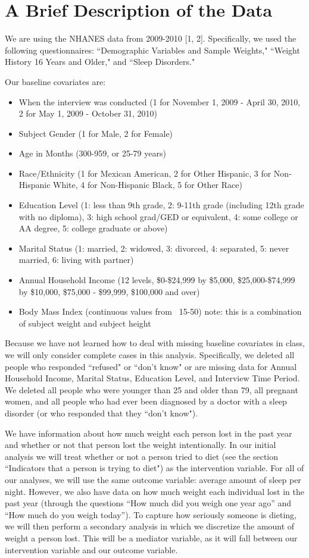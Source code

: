 \documentclass{article}
\begin{document}
\section{A Brief Description of the Data}

We are using the NHANES data from 2009-2010 [1, 2].  Specifically, we used the following questionnaires: ``Demographic Variables and Sample Weights," ``Weight History 16 Years and Older," and ``Sleep Disorders."

Our baseline covariates are:
\begin{itemize}
\item When the interview was conducted (1 for November 1, 2009 - April 30, 2010, 2 for May 1, 2009 - October 31, 2010)
\item Subject Gender (1 for Male, 2 for Female)
\item Age in Months (300-959, or 25-79 years)
\item Race/Ethnicity (1 for Mexican American, 2 for Other Hispanic, 3 for Non-Hispanic White, 4 for Non-Hispanic Black, 5 for Other Race)
\item Education Level (1: less than 9th grade, 2: 9-11th grade (including 12th grade with no diploma), 3: high school grad/GED or equivalent, 4: some college or AA degree, 5: college graduate or above)
\item Marital Status (1: married, 2: widowed, 3: divorced, 4: separated, 5: never married, 6: living with partner)
\item Annual Household Income (12 levels, \$0-\$24,999 by \$5,000, \$25,000-\$74,999 by \$10,000,  \$75,000 - \$99,999, \$100,000 and over)
\item Body Mass Index (continuous values from ~15-50) note: this is a combination of subject weight and subject height
\end{itemize}

Because we have not learned how to deal with missing baseline covariates in class, we will only consider complete cases in this analysis.  Specifically, we deleted all people who responded ``refused" or ``don't know" or are missing data for Annual Household Income, Marital Status, Education Level, and Interview Time Period.  We deleted all people who were younger than 25 and older than 79, all pregnant women, and all people who had ever been diagnosed by a doctor with a sleep disorder (or who responded that they ``don't know").  

We have information about how much weight each person lost in the past year and whether or not that person lost the weight intentionally.  In our initial analysis we will treat whether or not a person tried to diet (see the section ``Indicators that a person is trying to diet") as the intervention variable. For all of our analyses, we will use the same outcome variable: average amount of sleep per night. However, we also have data on how much weight each individual lost in the past year (through the questions ``How much did you weigh one year ago'' and   ``How much do you weigh today'').  To capture how seriously someone is dieting, we will then perform a secondary analysis in which we discretize the amount of weight a person lost.  This will be a mediator variable, as it will fall between our intervention variable and our outcome variable.  
\end{document}
